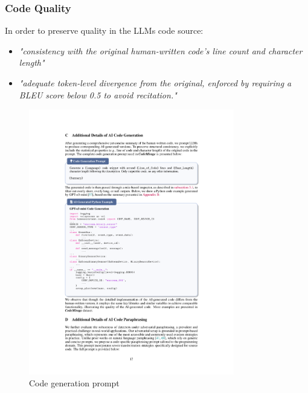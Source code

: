 \subsubsection*{Code Quality}
In order to preserve quality in the LLMs code source:
\begin{itemize}
    \item \textit{"consistency with the original human-written code's line count and character length"}
    \item \textit{"adequate token-level divergence from the original, enforced by requiring a 
    BLEU \cite{papineni2002bleu} score below 0.5 to avoid recitation."} 
\end{itemize}




\begin{figure}[H]
    \centering
    \includegraphics[width=0.8\textwidth]{img/CodeMirage/Propt_Generation.pdf}
    \caption{Code generation prompt}
    \label{fig:propt_generation}
\end{figure}


